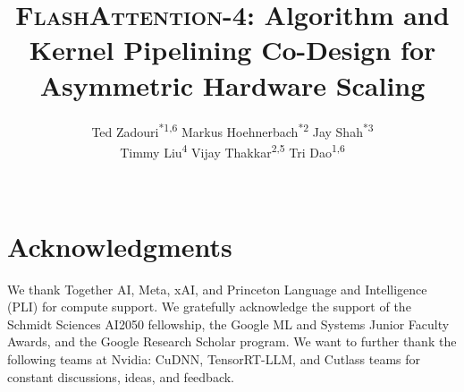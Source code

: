 \documentclass[11pt]{article}
\newcommand{\faf}{\textsc{FlashAttention-4}\xspace}
\begin{document}
\title{\faf: Algorithm and Kernel Pipelining Co-Design for Asymmetric Hardware Scaling}

\author{%
  \begin{tabular}{c}
    Ted Zadouri\textsuperscript{*1,6} \quad
    Markus Hoehnerbach\textsuperscript{*2} \quad
    Jay Shah\textsuperscript{*3} \\
    Timmy Liu\textsuperscript{4} \quad
    Vijay Thakkar\textsuperscript{2,5} \quad
    Tri Dao\textsuperscript{1,6}
  \end{tabular}
  \\
}
\date{}

\begingroup
\renewcommand{\thefootnote}{\fnsymbol{footnote}}
\maketitle
{}
\endgroup

\begin{abstract}

\end{abstract}








\section*{Acknowledgments}
We thank Together AI, Meta, xAI, and Princeton Language and Intelligence (PLI) for compute support. We gratefully acknowledge the support of the Schmidt Sciences AI2050 fellowship, the Google ML and Systems Junior Faculty Awards, and the Google Research Scholar program. We want to further thank the following teams at Nvidia: CuDNN, TensorRT-LLM, and Cutlass teams for constant discussions, ideas, and feedback.




\appendix

\end{document}
